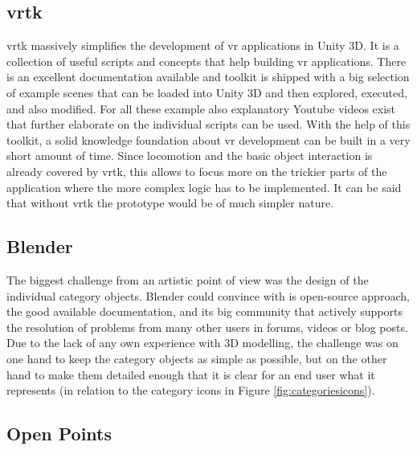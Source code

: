 \subsection{\gls{vrtk}}

\gls{vrtk} massively simplifies the development of \gls{vr} applications in Unity 3D. It is a collection of useful scripts and concepts that help building \gls{vr} applications. There is an excellent documentation available and toolkit is shipped with a big selection of example scenes that can be loaded into Unity 3D and then explored, executed, and also modified. For all these example also explanatory Youtube videos exist that further elaborate on the individual scripts can be used. With the help of this toolkit, a solid knowledge foundation about \gls{vr} development can be built in a very short amount of time. Since locomotion and the basic object interaction is already covered by \gls{vrtk}, this allows to focus more on the trickier parts of the application where the more complex logic has to be implemented. It can be said that without \gls{vrtk} the prototype would be of much simpler nature.


\subsection{Blender}

The biggest challenge from an artistic point of view was the design of the individual category objects. Blender could convince with is open-source approach, the good available documentation, and its big community that actively supports the resolution of problems from many other users in forums, videos or blog posts. Due to the lack of any own experience with 3D modelling, the challenge was on one hand to keep the category objects as simple as possible, but on the other hand to make them detailed enough that it is clear for an end user what it represents (in relation to the category icons in Figure \ref{fig:categoriesicons}).


\subsection{Open Points}

